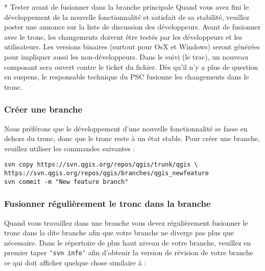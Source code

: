  * Tester avant de fusionner dans la branche principale
Quand vous avez fini le d\'eveloppement de la nouvelle fonctionnalit\'e et satisfait de sa stabilit\'e, veuillez poster une annonce sur la liste de discussion des d\'eveloppeurs. Avant de fusionner avec le tronc, les changements doivent \^etre test\'es par les d\'eveloppeurs et les utilisateurs. Les versions binaires (surtout pour OsX et Windows) seront g\'en\'er\'ees pour impliquer aussi les non-d\'eveloppeurs. Dans le suivi (le trac), un nouveau composant sera ouvert contre le ticket du fichier. D\`es qu'il n'y a plus  de question en suspens, le responsable technique du PSC fusionne les changements dans le tronc.

\subsubsection{Cr\'eer une branche}
Nous pr\'ef\'erons que le d\'eveloppement d'une nouvelle fonctionnalit\'e se fasse en dehors du tronc, donc que le tronc reste \`a un \'etat stable. Pour cr\'eer une branche, veuillez utiliser les commandes suivantes :
\begin{verbatim}
svn copy https://svn.qgis.org/repos/qgis/trunk/qgis \
https://svn.qgis.org/repos/qgis/branches/qgis_newfeature
svn commit -m "New feature branch"
\end{verbatim}


\subsubsection{Fusionner r\'eguli\`erement le tronc dans la branche}
Quand vous travaillez dans une branche vous devez r\'eguli\`erement fusionner le tronc dans la dite branche afin que votre branche ne diverge pas plus que n\'ecessaire. Dans le r\'epertoire de plus haut niveau de votre branche, veuillez en premier taper \texttt{`svn info`} afin d'obtenir la version de r\'evision de votre branche ce qui doit afficher quelque chose similaire \`a :

